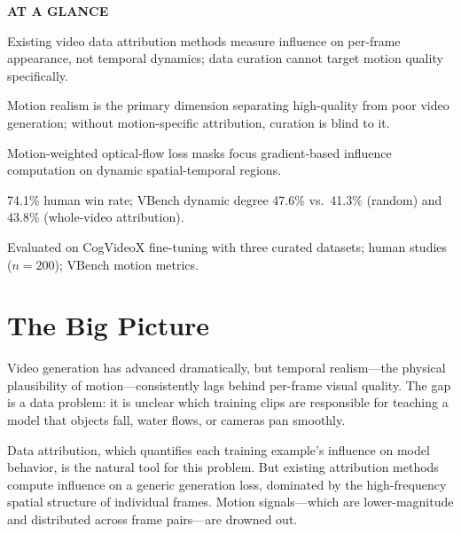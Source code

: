 \documentclass[10pt,twocolumn]{article}
\begin{document}
\begin{mdframed}[backgroundcolor=boxgray,linecolor=rulered,linewidth=1pt,
    innerleftmargin=6pt,innerrightmargin=6pt,
    innertopmargin=6pt,innerbottommargin=6pt]
\textbf{\small AT A GLANCE}\par\vspace{4pt}
\begin{description}[leftmargin=0pt,labelsep=4pt,itemsep=2pt,parsep=0pt,
    font=\small\bfseries]
  \item[Problem:] Existing video data attribution methods measure influence on
    per-frame appearance, not temporal dynamics; data curation cannot target
    motion quality specifically.
  \item[Why it matters:] Motion realism is the primary dimension separating
    high-quality from poor video generation; without motion-specific attribution,
    curation is blind to it.
  \item[Method:] Motion-weighted optical-flow loss masks focus gradient-based
    influence computation on dynamic spatial-temporal regions.
  \item[Result:] 74.1\% human win rate; VBench dynamic degree 47.6\%
    vs.\ 41.3\% (random) and 43.8\% (whole-video attribution).
  \item[Evidence:] Evaluated on CogVideoX fine-tuning with three curated
    datasets; human studies ($n{=}200$); VBench motion metrics.
\end{description}
\end{mdframed}

\section{The Big Picture}

Video generation has advanced dramatically, but temporal realism---the
physical plausibility of motion---consistently lags behind per-frame
visual quality. The gap is a data problem: it is unclear which training
clips are responsible for teaching a model that objects fall, water flows,
or cameras pan smoothly.

Data attribution, which quantifies each training example's influence on
model behavior, is the natural tool for this problem. But existing attribution
methods compute influence on a generic generation loss, dominated by the
high-frequency spatial structure of individual frames. Motion signals---which
are lower-magnitude and distributed across frame pairs---are drowned out.
\end{document}
